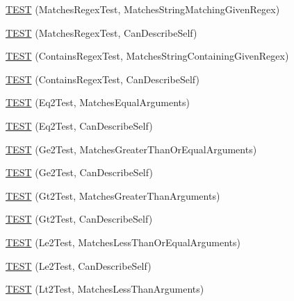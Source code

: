 \begin{DoxyCompactItemize}
\item 
\mbox{\hyperlink{namespacetesting_1_1gmock__matchers__test_a5983e981b59498c6427ddb183c414bb7}{T\+E\+ST}} (Matches\+Regex\+Test, Matches\+String\+Matching\+Given\+Regex)
\item 
\mbox{\hyperlink{namespacetesting_1_1gmock__matchers__test_acb4e75ec699fe1bc178e7ec32fb479c8}{T\+E\+ST}} (Matches\+Regex\+Test, Can\+Describe\+Self)
\item 
\mbox{\hyperlink{namespacetesting_1_1gmock__matchers__test_a0a23f3ff8f97ccf74cd64673edc6694f}{T\+E\+ST}} (Contains\+Regex\+Test, Matches\+String\+Containing\+Given\+Regex)
\item 
\mbox{\hyperlink{namespacetesting_1_1gmock__matchers__test_ac3d469a146dec0c6ede2b46ff992c8d7}{T\+E\+ST}} (Contains\+Regex\+Test, Can\+Describe\+Self)
\item 
\mbox{\hyperlink{namespacetesting_1_1gmock__matchers__test_a768adf8450910e4c3ac0cb2caec8a4c2}{T\+E\+ST}} (Eq2\+Test, Matches\+Equal\+Arguments)
\item 
\mbox{\hyperlink{namespacetesting_1_1gmock__matchers__test_a45da3962b4ae052dd47e1ae1bfd8b762}{T\+E\+ST}} (Eq2\+Test, Can\+Describe\+Self)
\item 
\mbox{\hyperlink{namespacetesting_1_1gmock__matchers__test_a100bae52c11f2e44a141652002d3bee2}{T\+E\+ST}} (Ge2\+Test, Matches\+Greater\+Than\+Or\+Equal\+Arguments)
\item 
\mbox{\hyperlink{namespacetesting_1_1gmock__matchers__test_aaee5baf487e6234d1d8b6779b70a15c0}{T\+E\+ST}} (Ge2\+Test, Can\+Describe\+Self)
\item 
\mbox{\hyperlink{namespacetesting_1_1gmock__matchers__test_a4ef0cb0e88b7801075798649189d7b72}{T\+E\+ST}} (Gt2\+Test, Matches\+Greater\+Than\+Arguments)
\item 
\mbox{\hyperlink{namespacetesting_1_1gmock__matchers__test_ae7351eb01d03897324b2fe03045f2c10}{T\+E\+ST}} (Gt2\+Test, Can\+Describe\+Self)
\item 
\mbox{\hyperlink{namespacetesting_1_1gmock__matchers__test_add304ba60989990fc78a616c9592a948}{T\+E\+ST}} (Le2\+Test, Matches\+Less\+Than\+Or\+Equal\+Arguments)
\item 
\mbox{\hyperlink{namespacetesting_1_1gmock__matchers__test_a75d0bbfa66d404aa458f0739297c9edc}{T\+E\+ST}} (Le2\+Test, Can\+Describe\+Self)
\item 
\mbox{\hyperlink{namespacetesting_1_1gmock__matchers__test_ac7ecdd71d0cc49438f7ad1863fdfab05}{T\+E\+ST}} (Lt2\+Test, Matches\+Less\+Than\+Arguments)
\item 

\end{DoxyCompactItemize}
